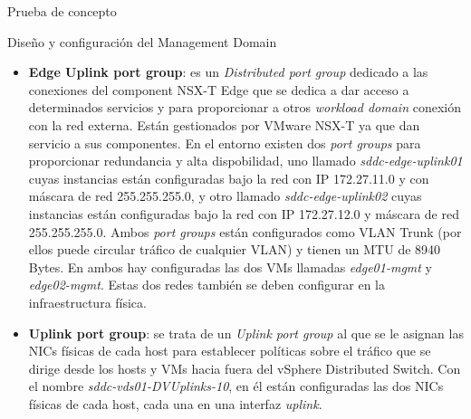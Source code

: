 \begin{section}{Prueba de concepto}
\begin{subsection}{Diseño y configuración del Management Domain}
\begin{itemize}
            \item \textbf{Edge Uplink port group}: es un \textit{Distributed port group} dedicado a las conexiones del component NSX-T Edge que se dedica a dar acceso a determinados servicios y para proporcionar a otros \textit{workload domain} conexión con la red externa. Están gestionados por VMware NSX-T ya que dan servicio a sus componentes. En el entorno existen dos \textit{port groups} para proporcionar redundancia y alta dispobilidad, uno llamado \textit{sddc-edge-uplink01} cuyas instancias están configuradas bajo la red con IP 172.27.11.0 y con máscara de red 255.255.255.0, y otro llamado \textit{sddc-edge-uplink02} cuyas instancias están configuradas bajo la red con IP 172.27.12.0 y máscara de red 255.255.255.0. Ambos \textit{port groups} están configurados como VLAN Trunk (por ellos puede circular tráfico de cualquier VLAN) y tienen un MTU de 8940 Bytes. En ambos hay configuradas las dos VMs llamadas \textit{edge01-mgmt} y \textit{edge02-mgmt}. Estas dos redes también se deben configurar en la infraestructura física.
            
            \item \textbf{Uplink port group}: se trata de un \textit{Uplink port group} al que se le asignan las NICs físicas de cada host para establecer políticas sobre el tráfico que se dirige desde los hosts y VMs hacia fuera del vSphere Distributed Switch. Con el nombre \textit{sddc-vds01-DVUplinks-10}, en él están configuradas las dos NICs físicas de cada host, cada una en una interfaz \textit{uplink}.
            

\end{itemize}
\end{subsection}
\end{section}
